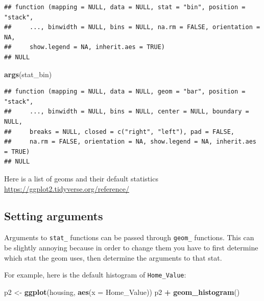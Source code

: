 \documentclass[
]{book}
\newenvironment{Shaded}{\begin{snugshade}}{\end{snugshade}}
\newcommand{\DataTypeTok}[1]{\textcolor[rgb]{0.13,0.29,0.53}{#1}}
\newcommand{\KeywordTok}[1]{\textcolor[rgb]{0.13,0.29,0.53}{\textbf{#1}}}
\newcommand{\NormalTok}[1]{#1}
\newcommand{\OperatorTok}[1]{\textcolor[rgb]{0.81,0.36,0.00}{\textbf{#1}}}
\newcommand{\StringTok}[1]{\textcolor[rgb]{0.31,0.60,0.02}{#1}}
\begin{document}
\begin{verbatim}
## function (mapping = NULL, data = NULL, stat = "bin", position = "stack", 
##     ..., binwidth = NULL, bins = NULL, na.rm = FALSE, orientation = NA, 
##     show.legend = NA, inherit.aes = TRUE) 
## NULL
\end{verbatim}

\begin{Shaded}
\begin{Highlighting}[]
\KeywordTok{args}\NormalTok{(stat\_bin)}
\end{Highlighting}
\end{Shaded}

\begin{verbatim}
## function (mapping = NULL, data = NULL, geom = "bar", position = "stack", 
##     ..., binwidth = NULL, bins = NULL, center = NULL, boundary = NULL, 
##     breaks = NULL, closed = c("right", "left"), pad = FALSE, 
##     na.rm = FALSE, orientation = NA, show.legend = NA, inherit.aes = TRUE) 
## NULL
\end{verbatim}

Here is a list of geoms and their default statistics \url{https://ggplot2.tidyverse.org/reference/}

\hypertarget{setting-arguments}{%
\subsection{Setting arguments}\label{setting-arguments}}

Arguments to \texttt{stat\_} functions can be passed through \texttt{geom\_} functions. This can be slightly annoying because in order to change them you have to first determine which stat the geom uses, then determine the arguments to that stat.

For example, here is the default histogram of \texttt{Home\_Value}:

\begin{Shaded}
\begin{Highlighting}[]
\NormalTok{p2 \textless{}{-}}\StringTok{ }\KeywordTok{ggplot}\NormalTok{(housing, }\KeywordTok{aes}\NormalTok{(}\DataTypeTok{x =}\NormalTok{ Home\_Value))}
\NormalTok{p2 }\OperatorTok{+}\StringTok{ }\KeywordTok{geom\_histogram}\NormalTok{()}
\end{Highlighting}
\end{Shaded}
\end{document}
